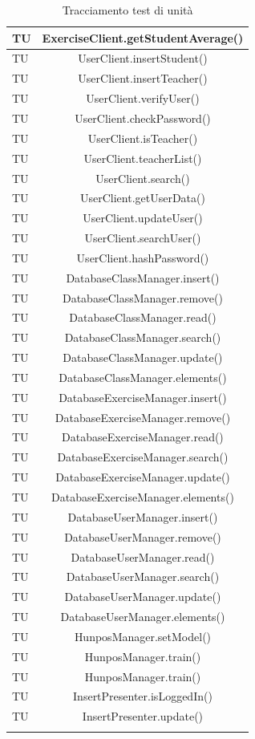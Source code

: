 \begin{longtable}{|>{\centering\arraybackslash}m{1.6cm}|c|}
		TU & ExerciseClient.getStudentAverage()  \\ \hline
		TU & UserClient.insertStudent()  \\ \hline
		TU & UserClient.insertTeacher()  \\ \hline
		TU & UserClient.verifyUser()  \\ \hline
		TU & UserClient.checkPassword()  \\ \hline
		TU & UserClient.isTeacher()  \\ \hline
		TU & UserClient.teacherList()  \\ \hline
		TU & UserClient.search()  \\ \hline
		TU & UserClient.getUserData()  \\ \hline
		TU & UserClient.updateUser()  \\ \hline
		TU & UserClient.searchUser()  \\ \hline
		TU & UserClient.hashPassword()  \\ \hline
		TU & DatabaseClassManager.insert()  \\ \hline
		TU & DatabaseClassManager.remove()  \\ \hline
		TU & DatabaseClassManager.read()  \\ \hline
		TU & DatabaseClassManager.search()  \\ \hline
		TU & DatabaseClassManager.update()  \\ \hline
		TU & DatabaseClassManager.elements()  \\ \hline
		TU & DatabaseExerciseManager.insert()  \\ \hline
		TU & DatabaseExerciseManager.remove()  \\ \hline
		TU & DatabaseExerciseManager.read()  \\ \hline
		TU & DatabaseExerciseManager.search()  \\ \hline
		TU & DatabaseExerciseManager.update()  \\ \hline
		TU & DatabaseExerciseManager.elements()  \\ \hline
		TU & DatabaseUserManager.insert()  \\ \hline
		TU & DatabaseUserManager.remove()  \\ \hline
		TU & DatabaseUserManager.read()  \\ \hline
		TU & DatabaseUserManager.search()  \\ \hline
		TU & DatabaseUserManager.update()  \\ \hline
		TU & DatabaseUserManager.elements()  \\ \hline
		TU & HunposManager.setModel()  \\ \hline
		TU & HunposManager.train()  \\ \hline
		TU & HunposManager.train()  \\ \hline
		TU & InsertPresenter.isLoggedIn()  \\ \hline
		TU & InsertPresenter.update()  \\ \hline
		\caption{Tracciamento test di unità}
\end{longtable}

